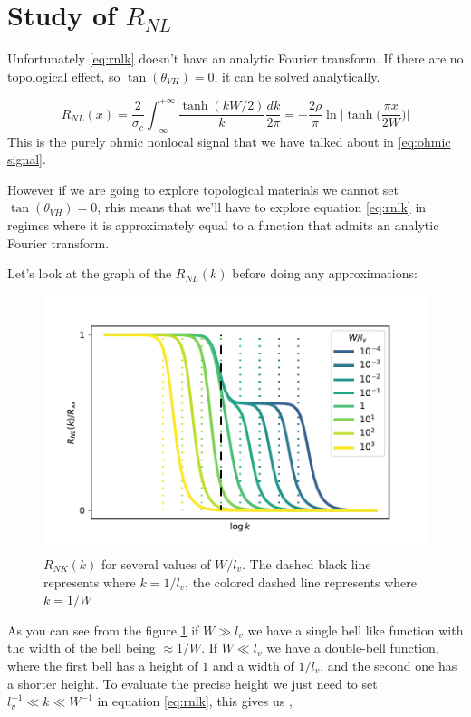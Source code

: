 \section{Study of $R_{NL}$}
Unfortunately \ref{eq:rnlk} doesn't have an analytic Fourier transform. If there are no topological effect, so $\tan (\theta_{VH})=0$, it can be solved analytically.

\begin{equation}
    R_{NL}(x)=\frac 2{\sigma_c}\int_{-\infty}^{+\infty}
    \frac{\tanh (kW/2)}k \frac {dk}{2\pi}=
    -\frac{2\rho}\pi\ln\bigg |\tanh \Big(\frac{\pi x}{2W}\Big)\bigg |
    \label{eq:ohmic signal2}
\end{equation}
This is the purely ohmic nonlocal signal that we have talked about in \ref{eq:ohmic signal}.

However if we are going to explore topological materials we cannot set $\tan (\theta_{VH})=0$, rhis means that we'll have to explore equation \ref{eq:rnlk} in regimes where it is approximately equal to a function that admits an analytic Fourier transform.

Let's look at the graph of the $R_{NL}(k)$ before doing any approximations:
\begin{figure}[h!]
    \centering
    \includegraphics[width=\linewidth]{Immagini/rnl/widths.pdf}
    \caption{$R_{NK}(k)$ for several values of $W/l_v$. The dashed black line represents where $k=1/l_v$, the colored dashed line represents where $k=1/W$}
    \label{fig:RNLk}
\end{figure}
As you can see from the figure \ref{fig:RNLk} if $W\gg l_v$ we have a single bell like function with the width of the bell being $\approx 1/W$. If $W\ll l_v$ we have a double-bell function, where the first bell has a height of $1$ and a width of $1/l_v$, and the second one has a shorter height. To evaluate the precise height we just need to set $l_v^{-1}\ll k \ll W^{-1}$ in equation \ref{eq:rnlk}, this gives us 
,

